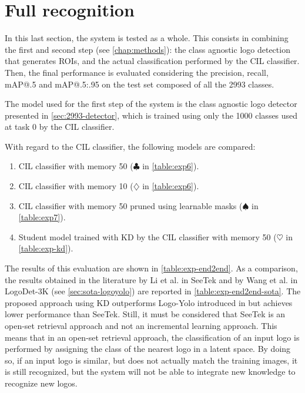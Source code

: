 \section{Full recognition}
\label{sec:exp-end2end}
In this last section, the system is tested as a whole.
This consists in combining the first and second step (see \autoref{chap:methods}): the class agnostic logo detection that generates ROIs, and the actual classification performed by the CIL classifier.
Then, the final performance is evaluated considering the precision, recall, mAP@.5 and mAP@.5:.95 on the test set composed of all the 2993 classes.

The model used for the first step of the system is the class agnostic logo detector presented in \autoref{sec:2993-detector}, which is trained using only the 1000 classes used at task 0 by the CIL classifier.

With regard to the CIL classifier, the following models are compared:
\begin{enumerate}
    \item CIL classifier with memory 50 ($\clubsuit$ in \autoref{table:exp6}).
    \item CIL classifier with memory 10 ($\diamondsuit$ in \autoref{table:exp6}).
    \item CIL classifier with memory 50 pruned using learnable masks ($\spadesuit$ in \autoref{table:exp7}).
    \item Student model trained with KD by the CIL classifier with memory 50 ($\heartsuit$ in \autoref{table:exp-kd}).
\end{enumerate}

The results of this evaluation are shown in \autoref{table:exp-end2end}. As a comparison, the results obtained in the literature by Li et al. in SeeTek \cite{li2022seetek} and by Wang et al. in LogoDet-3K \cite{wang2022logodet} (see \autoref{sec:sota-logoyolo}) are reported in \autoref{table:exp-end2end-sota}. The proposed approach using KD outperforms Logo-Yolo introduced in \cite{wang2022logodet} but achieves lower performance than SeeTek.
Still, it must be considered that SeeTek is an open-set retrieval approach and not an incremental learning approach.
This means that in an open-set retrieval approach, the classification of an input logo is performed by assigning the class of the nearest logo in a latent space. By doing so, if an input logo is similar, but does not actually match the training images, it is still recognized, but the system will not be able to integrate new knowledge to recognize new logos.

